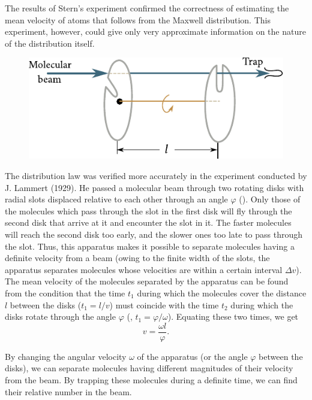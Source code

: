 The results of Stern's experiment confirmed the correctness of estimating the mean velocity of atoms that follows from the Maxwell distribution. This experiment, however, could give only very approximate information on the nature of the distribution itself.

\begin{figure}[t]
	\begin{center}
		\includegraphics[scale=1.0]{figures/ch_11/fig_11_21.pdf}
		\caption[]{}
		\label{fig:11_21}
	\end{center}
	\vspace{-0.7cm}
\end{figure}

The distribution law was verified more accurately in the experiment conducted by J. Lammert (1929). He passed a molecular beam through two rotating disks with radial slots displaced relative to each other through an angle $\varphi$ (). Only those of the molecules which pass through the slot in the first disk will fly through the second disk that arrive at it and encounter the slot in it. The faster molecules will reach the second disk too early, and the slower ones too late to pass through the slot. Thus, this apparatus makes it possible to separate molecules having a definite velocity from a beam (owing to the finite width of the slots, the apparatus separates molecules whose velocities are within a certain interval $\Delta v$). The mean velocity of the molecules separated by the apparatus can be found from the condition that the time $t_1$ during which the molecules cover the distance $l$ between the disks ($t_1=l/v$) must coincide with the time $t_2$ during which the disks rotate through the angle $\varphi$ (\ie, $t_1=\varphi/\omega$). Equating these two times, we get
\begin{equation*}
	v = \frac{\omega l}{\varphi}.
\end{equation*}

\noindent
By changing the angular velocity $\omega$ of the apparatus (or the angle $\varphi$ between the disks), we can separate molecules having different magnitudes of their velocity from the beam. By trapping these molecules during a definite time, we can find their relative number in the beam.

